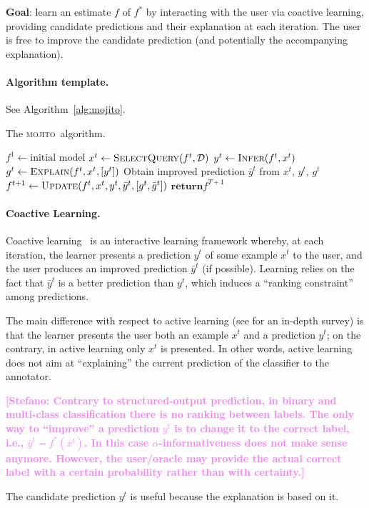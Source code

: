 \documentclass[a4paper,12pt]{article}
\newcommand{\stefano}[1]{{\bf \textcolor{violet}{{[Stefano: #1]}}}}
\newcommand{\mojito}{\textsc{mojito}}
\begin{document}
\textbf{Goal}: learn an estimate $f$ of $f^*$ by interacting with the user via
coactive learning, providing candidate predictions and their explanation at
each iteration. The user is free to improve the candidate prediction (and
potentially the accompanying explanation).

\paragraph{Algorithm template.} See Algorithm~\ref{alg:mojito}.

\begin{algorithm*}[t]
    \caption{\label{alg:mojito} The \mojito\ algorithm.}
    \begin{algorithmic}[1]
        \Procedure{\mojito}{$\calD$, $\vpsi$, $T$}
            \State $f^1 \gets \text{initial model}$
                \State $x^t \gets \textsc{SelectQuery}(f^t, \mathcal{D})$
                \State $y^t \gets \textsc{Infer}(f^t, x^t)$
                \State $g^t \gets \textsc{Explain}(f^t, x^t,[y^t])$
                \State Obtain improved prediction $\bar{y}^t$ from $x^t$, $y^t$, $g^t$
                \State $f^{t+1} \gets \textsc{Update}(f^t,x^t,y^t,\bar{y}^t,[g^t,\bar{g}^t])$
            \EndFor
            \State $\textbf{return} f^{T+1}$
        \EndProcedure
    \end{algorithmic}
\end{algorithm*}

\paragraph{Coactive Learning.} Coactive learning~\cite{shivaswamy2015coactive}
is an interactive learning framework whereby, at each iteration, the learner
presents a prediction $y^t$ of some example $x^t$ to the user, and the user
produces an improved prediction $\bar{y}^t$ (if possible). Learning relies on
the fact that $\bar{y}^t$ is a better prediction than $y^t$, which induces a
``ranking constraint'' among predictions.

The main difference with respect to active learning (see
\cite{settles2010active} for an in-depth survey) is that the learner presents
the user both an example $x^t$ and a prediction $y^t$; on the contrary, in
active learning only $x^t$ is presented. In other words, active learning does
not aim at ``explaining'' the current prediction of the classifier to the
annotator.

\stefano{Contrary to structured-output prediction, in binary and multi-class
classification there is no ranking between labels. The only way to ``improve''
a prediction $y^t$ is to change it to the correct label, i.e., $\bar{y}^t =
f^*(x^t)$. In this case $\alpha$-informativeness does not make sense anymore.
However, the user/oracle may provide the actual correct label with a certain
probability rather than with certainty.}

The candidate prediction $y^t$ is useful because the explanation is based on
it.



\end{document}
